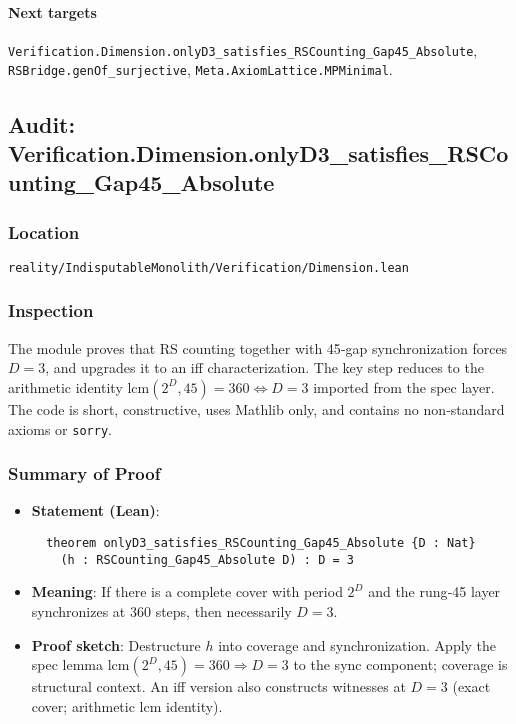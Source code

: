 \documentclass{article}
\newcommand{\FileRef}[1]{\texttt{#1}}
\begin{document}
\paragraph{Next targets} \texttt{Verification.Dimension.onlyD3\_satisfies\_RSCounting\_Gap45\_Absolute}, \texttt{RSBridge.genOf\_surjective}, \texttt{Meta.AxiomLattice.MPMinimal}.

\subsection{Audit: Verification.Dimension.onlyD3\_satisfies\_RSCounting\_Gap45\_Absolute}
\subsubsection{Location}
\FileRef{reality/IndisputableMonolith/Verification/Dimension.lean}

\subsubsection{Inspection}
The module proves that RS counting together with 45‑gap synchronization forces \(D=3\), and upgrades it to an iff characterization. The key step reduces to the arithmetic identity \(\mathrm{lcm}(2^D,45)=360\iff D=3\) imported from the spec layer. The code is short, constructive, uses Mathlib only, and contains no non‑standard axioms or \texttt{sorry}.

\subsubsection{Summary of Proof}
\begin{itemize}[leftmargin=*]
  \item \textbf{Statement (Lean)}:
  \begin{lstlisting}
  theorem onlyD3_satisfies_RSCounting_Gap45_Absolute {D : Nat}
    (h : RSCounting_Gap45_Absolute D) : D = 3
  \end{lstlisting}
  \item \textbf{Meaning}: If there is a complete cover with period \(2^D\) and the rung‑45 layer synchronizes at 360 steps, then necessarily \(D=3\).
  \item \textbf{Proof sketch}: Destructure \(h\) into coverage and synchronization. Apply the spec lemma \(\mathrm{lcm}(2^D,45)=360\Rightarrow D=3\) to the sync component; coverage is structural context. An iff version also constructs witnesses at \(D=3\) (exact cover; arithmetic lcm identity).
\end{itemize}
\end{document}
